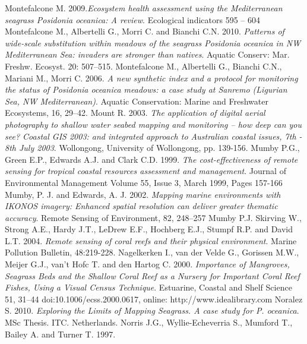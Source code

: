\documentclass[10pt, a4paper]{article}
\begin{document}
\begin{thebibliography}{999}
Montefalcone M. 2009.\emph{Ecosystem health assessment using the Mediterranean seagrass
\textit{Posidonia oceanica}: A review}. Ecological indicators 595 – 604 \pageref{Montefalcone09}
Montefalcone M., Albertelli G., Morri C. and Bianchi C.N. 2010. \emph{Patterns of wide-scale
substitution within meadows of the seagrass \textit{Posidonia oceanica} in NW Mediterranean Sea:
invaders are stronger than natives}. Aquatic Conserv: Mar. Freshw. Ecosyst. 20: 507–515. \pageref{Montefalcone10}
Montefalcone M., Albertelli G., Bianchi C.N., Mariani M., Morri C. 2006. \emph{A new
synthetic index and a protocol for monitoring the status of \textit{Posidonia oceanica} meadows: a
case study at Sanremo (Ligurian Sea, NW Mediterranean)}. Aquatic Conservation: Marine and
Freshwater Ecosystems, 16, 29–42. \pageref{Montefalcone06}
Mount R. 2003. \emph{The application of digital aerial photography to shallow water seabed
mapping and monitoring – how deep can you see? Coastal GIS 2003: and integrated
approach to Australian coastal issues, 7th - 8th July 2003}. Wollongong, University of
Wollongong, pp. 139-156. \pageref{Mount03}
Mumby P.G., Green E.P., Edwards A.J. and Clark C.D. 1999. \emph{The cost-effectiveness of
remote sensing for tropical coastal resources assessment and management}. Journal of
Environmental Management Volume 55, Issue 3, March 1999, Pages 157-166 \pageref{Mumby99}
Mumby, P. J. and Edwards, A. J. 2002. \emph{Mapping marine environments with IKONOS
imagery: Enhanced spatial resolution can deliver greater thematic accuracy}. Remote
Sensing of Environment, 82, 248–257 \pageref{Mumby02}
Mumby P.J. Skirving W., Strong A.E., Hardy J.T., LeDrew E.F., Hochberg E.J., Stumpf
R.P. and David L.T. 2004. \emph{Remote sensing of coral reefs and their physical environment}.
Marine Pollution Bulletin, 48:219-228. \pageref{Mumby04}
Nagelkerken I., van der Velde G., Gorissen M.W., Meijer G.J., van’t Hofc T. and den
Hartog C. 2000. \emph{Importance of Mangroves, Seagrass Beds and the Shallow Coral Reef as a
Nursery for Important Coral Reef Fishes, Using a Visual Census Technique}. Estuarine,
Coastal and Shelf Science 51, 31–44 doi:10.1006/ecss.2000.0617, online:
http://www.idealibrary.com \pageref{Nagelkerken00}
Noralez S. 2010. \emph{Exploring the Limits of Mapping Seagrass. A case study for P.
oceanica}. MSc Thesis. ITC. Netherlands. \pageref{Noralez10}
Norris J.G., Wyllie-Echeverria S., Mumford T., Bailey A. and Turner T. 1997.

\end{thebibliography}
\end{document}
